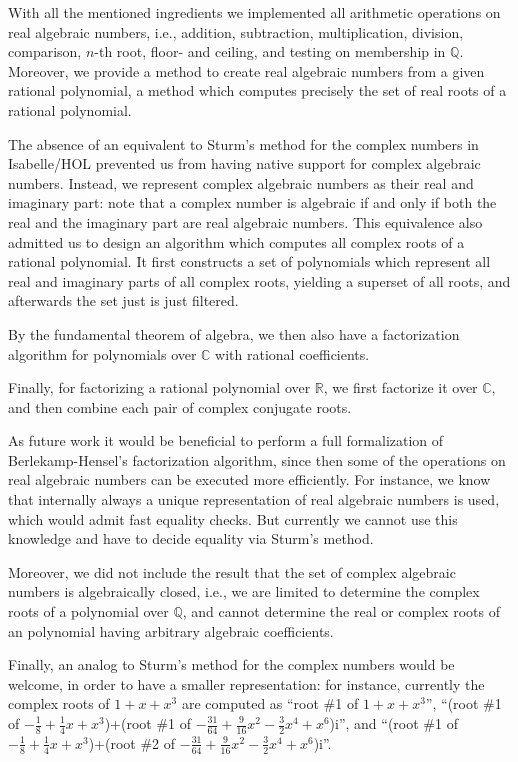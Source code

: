 \documentclass[11pt,a4paper]{article}
\newcommand\rats{\mathbb{Q}}
\newcommand\reals{\mathbb{R}}
\newcommand\complex{\mathbb{C}}
\begin{document}
With all the mentioned ingredients we implemented all arithmetic operations on real algebraic
numbers, i.e., addition, subtraction, multiplication, division, comparison, $n$-th root, floor-
and ceiling, and testing on membership in $\rats$. Moreover, we provide a method
to create real algebraic numbers from a given rational polynomial, a method which computes
precisely the set of real roots of a rational polynomial.

\medskip

The absence of an equivalent to Sturm's method for the complex numbers in Isabelle/HOL prevented
us from having native support for complex algebraic numbers. Instead, we represent complex
algebraic numbers as their real and imaginary part: note that a complex number is algebraic if
and only if both the real and the imaginary part are real algebraic numbers.
This equivalence also admitted us to design an algorithm which computes all complex roots
of a rational polynomial. It first constructs a set of polynomials which represent all
real and imaginary parts of all complex roots, yielding a superset of all roots,
and afterwards the set just is just filtered.

By the fundamental theorem of algebra, we then also have a factorization algorithm for
polynomials over $\complex$ with rational coefficients.

Finally, for factorizing a rational polynomial over $\reals$, we first factorize it over $\complex$,
and then combine each pair of complex conjugate roots.

\medskip

As future work it would be beneficial to perform  a full formalization of Berlekamp-Hensel's factorization
algorithm, since then some of the operations on real algebraic numbers can be executed more 
efficiently. For instance, we know that internally always a unique representation of 
real algebraic numbers is used, which would admit fast equality checks. But currently we cannot use this knowledge and have to decide equality via Sturm's method.

Moreover, we did not include the result that the set of complex algebraic numbers is algebraically
closed, i.e., we are limited to determine the complex roots of a polynomial over $\rats$, and
cannot determine the real or complex roots of an polynomial having arbitrary algebraic coefficients.

Finally, an analog to Sturm's method for the complex numbers would be welcome, in order to
have a smaller representation: for instance, currently the complex roots of $1 + x + x^3$ are
computed as ``root \#1 of $1 + x + x^3$'', 
``(root \#1 of $-\frac18 + \frac14x + x^3$)+(root \#1 of $-\frac{31}{64} + \frac{9}{16}x^2 - \frac32x^4 + x^6$)i'', and 
``(root \#1 of $-\frac18 + \frac14x + x^3$)+(root \#2 of $-\frac{31}{64} + \frac{9}{16}x^2 - \frac32x^4 + x^6$)i''.







\end{document}
